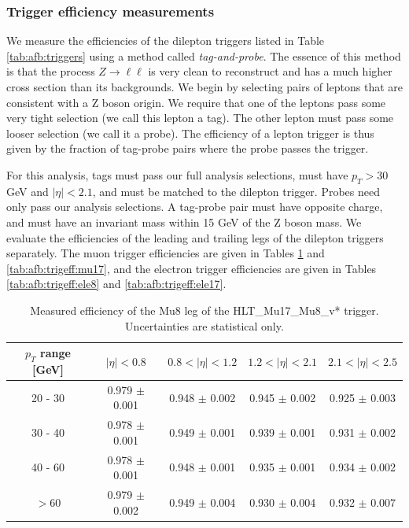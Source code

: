 \subsubsection*{Trigger efficiency measurements} %
We measure the efficiencies of the dilepton triggers listed in Table
\ref{tab:afb:triggers} using a method called \emph{tag-and-probe}. The
essence of this method is that the process $Z \rightarrow \ell\ell$
is very clean to reconstruct and has a much higher cross section than its
backgrounds. We begin by selecting pairs of leptons that are consistent with
a Z boson origin. We require that one of the leptons pass some very tight
selection (we call this lepton a tag). The other lepton must pass some
looser selection (we call it a probe). The efficiency of a lepton
trigger is thus given by the fraction of tag-probe pairs where the
probe passes the trigger.

For this analysis, tags must pass our full analysis selections, must
have $p_T > 30$ GeV and $|\eta| < 2.1$, and must be matched to the
dilepton trigger. Probes need only pass our analysis
selections. A tag-probe pair must have opposite charge, and must have an invariant mass within 15
GeV of the Z boson mass. We evaluate the efficiencies of the leading
and trailing legs of the dilepton triggers separately. The muon trigger
efficiencies are given in Tables \ref{tab:afb:trigeff:mu8} and
\ref{tab:afb:trigeff:mu17}, and the electron trigger efficiencies are
given in Tables \ref{tab:afb:trigeff:ele8} and \ref{tab:afb:trigeff:ele17}.

\begin{table}[htbp]
\begin{center}
\footnotesize
\caption{Measured efficiency of the Mu8 leg of the
HLT\_Mu17\_Mu8\_v* trigger. Uncertainties are statistical only.}
\label{tab:afb:trigeff:mu8}
\begin{tabular}{c|c|c|c|c}
\hline
\hline
  $p_T$ range [GeV] & $|\eta|<0.8$ & $0.8<|\eta|<1.2$ & $1.2<|\eta|<2.1$  & $2.1<|\eta|<2.5$\\
\hline
  20 -  30  & 0.979 $\pm$ 0.001 & 0.948 $\pm$ 0.002 & 0.945 $\pm$ 0.002 & 0.925 $\pm$ 0.003\\
  30 -  40  & 0.978 $\pm$ 0.001 & 0.949 $\pm$ 0.001 & 0.939 $\pm$ 0.001 & 0.931 $\pm$ 0.002\\
  40 -  60  & 0.978 $\pm$ 0.001 & 0.948 $\pm$ 0.001 & 0.935 $\pm$ 0.001 & 0.934 $\pm$ 0.002\\
  $>$60     & 0.979 $\pm$ 0.002 & 0.949 $\pm$ 0.004 & 0.930 $\pm$ 0.004 & 0.932 $\pm$ 0.007\\
\hline
\hline
\end{tabular}
\end{center}
\end{table}

